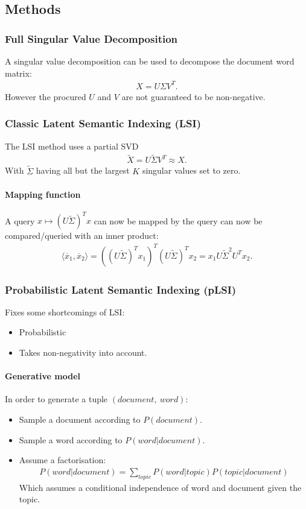 \subsection{Methods}
\subsubsection{Full Singular Value Decomposition}
A singular value decomposition can be used to decompose the document word matrix:
\begin{align*}
    X = U\Sigma V^T.
\end{align*}
However the procured $U$ and $V$ are not guaranteed to be non-negative. 

\subsubsection{Classic Latent Semantic Indexing (LSI)}
The LSI method uses a partial SVD
\begin{align*}
    \tilde X = U\tilde \Sigma V^T \approx X.
\end{align*}
With $\tilde \Sigma$ having all but the largest $K$ singular values set to zero. 

\paragraph{Mapping function} A query $x\mapsto (U\tilde \Sigma)^T x$
 can now be mapped by the query can now be compared/queried with an inner product:
\begin{align*}
\langle \overline x_1 , \overline x_2\rangle = 
    \left( 
        \left(
            U\tilde \Sigma
        \right)^T x_1
     \right)^T
    \left( U\tilde \Sigma \right)^T x_2 = x_1 U\tilde \Sigma^2 U^T x_2.
\end{align*}

\subsubsection{Probabilistic Latent Semantic Indexing (pLSI)}
Fixes some shortcomings of LSI:
\begin{itemize}
    \item Probabilistic
    \item Takes non-negativity into account. 
\end{itemize}

\paragraph{Generative model} In order to generate a tuple $(document,\ word)$:
\begin{itemize}
\item Sample a document according to $P(document)$.
\item Sample a word according to $P(word|document)$.
\item Assume a factorisation:
    \begin{align*}
        P(word|document) = \sum_{topic} P(word|topic) P(topic|document)
    \end{align*}
    Which assumes a conditional independence of word and document given the topic.
\end{itemize}

